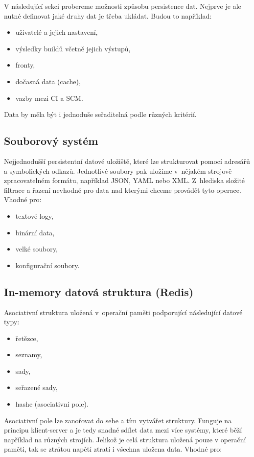 V následující sekci probereme možnosti způsobu persistence dat.
Nejprve je ale nutné definovat jaké druhy dat je třeba ukládat.
Budou to například:

\begin{itemize}
	\item uživatelé a jejich nastavení,
	\item výsledky buildů včetně jejich výstupů,
	\item fronty,
	\item dočasná data (cache),
	\item vazby mezi CI a SCM.
\end{itemize}

Data by měla být i jednoduše seřaditelná podle různých kritérií.

\subsection{Souborový systém}

Nejjednodušší persistentní datové uložiště, které lze strukturovat pomocí adresářů a symbolických odkazů.
Jednotlivé soubory pak uložíme v~nějakém strojově zpracovatelném formátu, například JSON, YAML nebo XML.
Z~hlediska složité filtrace a řazení nevhodné pro data nad kterými chceme provádět tyto operace.
Vhodné pro:
\begin{itemize}
	\item textové logy,
	\item binární data,
	\item velké soubory,
	\item konfigurační soubory.
\end{itemize}

\subsection{In-memory datová struktura (Redis)}

Asociativní struktura uložená v~operační paměti podporující následující datové typy:

\begin{itemize}
	\item řetězce,
	\item seznamy,
	\item sady,
	\item seřazené sady,
	\item hashe (asociativní pole).
\end{itemize}

Asociativní pole lze zanořovat do sebe a tím vytvářet struktury.
Funguje na principu klient-server a je tedy snadné sdílet data mezi více systémy, které běží například na různých strojích.
Jelikož je celá struktura uložená pouze v operační paměti, tak se ztrátou napětí ztratí i všechna uložena data.
Vhodné pro:

